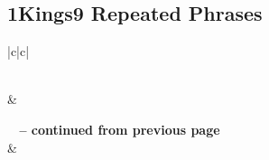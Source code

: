 \subsection{1Kings9 Repeated Phrases}


\normalsize
 
\begin{center}
\begin{longtable}{|c|c|}
\caption[1Kings9 Repeated Phrases]{1Kings9 Repeated Phrases}\label{table:Repeated Phrases 1Kings9} \\
\hline {} &  \\ \hline 
\endfirsthead
 
{{\bfseries \tablename\ \thetable{} -- continued from previous page}} \\  
\hline {} &  \\ \hline 
\endhead
 

\end{longtable}
\end{center}
